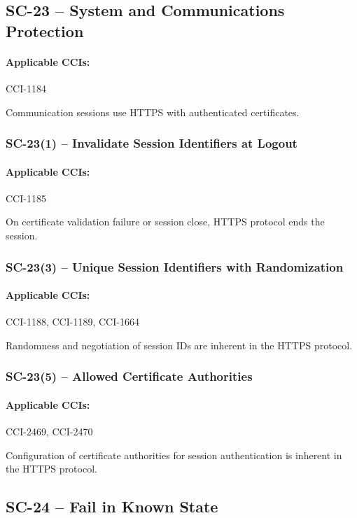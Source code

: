 \documentclass[letterpaper, 10pt, twoside]{article}
\begin{document}
\subsection{SC-23 -- System and Communications Protection}

\paragraph{Applicable CCIs:} CCI-1184

Communication sessions use HTTPS with authenticated certificates.

\subsubsection{SC-23(1) -- Invalidate Session Identifiers at Logout}

\paragraph{Applicable CCIs:} CCI-1185

On certificate validation failure or session close, HTTPS protocol ends the session.

\subsubsection{SC-23(3) -- Unique Session Identifiers with Randomization}

\paragraph{Applicable CCIs:} CCI-1188, CCI-1189, CCI-1664

Randomness and negotiation of session IDs are inherent in the HTTPS protocol.

\subsubsection{SC-23(5) -- Allowed Certificate Authorities}

\paragraph{Applicable CCIs:} CCI-2469, CCI-2470 

Configuration of certificate authorities for session authentication is inherent in the HTTPS protocol.

\subsection{SC-24 -- Fail in Known State}
\end{document}
